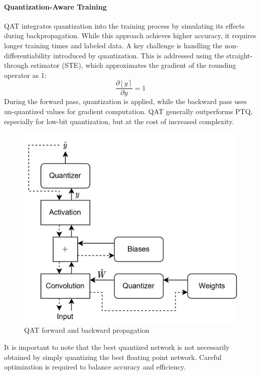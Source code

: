 \paragraph*{Quantization-Aware Training}
QAT integrates quantization into the training process by simulating its effects during backpropagation. 
While this approach achieves higher accuracy, it requires longer training times and labeled data. 
A key challenge is handling the non-differentiability introduced by quantization. 
This is addressed using the straight-through estimator (STE), which approximates the gradient of the rounding operator as 1:
\[\dfrac{\partial\left\lfloor y\right\rceil}{\partial y}=1\]
During the forward pass, quantization is applied, while the backward pass uses un-quantized values for gradient computation. 
QAT generally outperforms PTQ, especially for low-bit quantization, but at the cost of increased complexity.
\begin{figure}[H]
    \centering
    \includegraphics[width=0.5\linewidth]{images/eeai10.png}
    \caption{QAT forward and backward propagation}
\end{figure}
\noindent It is important to note that the best quantized network is not necessarily obtained by simply quantizing the best floating point network. 
Careful optimization is required to balance accuracy and efficiency.

